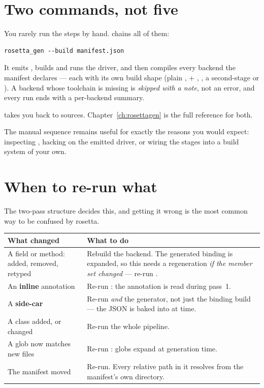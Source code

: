 \section{Two commands, not five}

You rarely run the steps by hand.  chains all of
them:

\begin{lstlisting}[style=sh]
rosetta_gen --build manifest.json
\end{lstlisting}

It emits , builds and runs the driver, and then compiles every
backend the manifest declares --- each with its own build shape (plain
,  + , , a
second-stage  or ). A backend whose
toolchain is missing is \emph{skipped with a note}, not an error, and every run
ends with a per-backend summary.

 takes you back to sources. Chapter~\ref{ch:rosettagen}
is the full reference for both.

The manual sequence remains useful for exactly the reasons you would expect:
inspecting , hacking on the emitted driver, or wiring the
stages into a build system of your own.

\section{When to re-run what}

The two-pass structure decides this, and getting it wrong is the most common
way to be confused by rosetta.

\begin{center}
\small
\begin{tabular}{@{}L{6.2cm}L{7.4cm}@{}}
\toprule
\textbf{What changed} & \textbf{What to do} \\
\midrule
A field or method: added, removed, retyped &
  Rebuild the backend. The generated binding is expanded, so this needs a
  regeneration \emph{if the member set changed} --- re-run . \\
\addlinespace
An \textbf{inline} annotation &
  Re-run : the annotation is read during pass~1. \\
\addlinespace
A \textbf{side-car}  &
  Re-run  \emph{and} the generator, not just the binding
  build --- the JSON is baked into  at 
  time. \\
\addlinespace
A class added, or  changed &
  Re-run the whole pipeline. \\
\addlinespace
A  glob now matches new files &
  Re-run : globs expand at generation time. \\
\addlinespace
The manifest moved &
  Re-run. Every relative path in it resolves from the manifest's own directory. \\
\bottomrule
\end{tabular}
\end{center}

